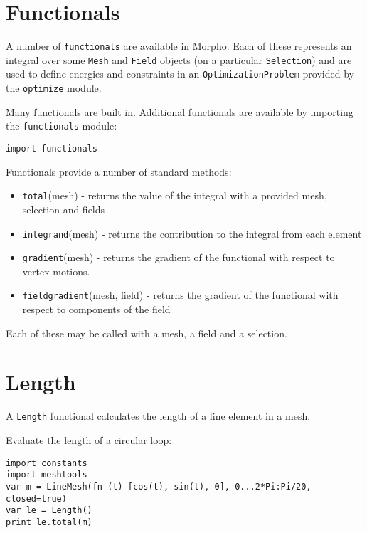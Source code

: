 \hypertarget{functionals}{%
\section{Functionals}\label{functionals}}

A number of \texttt{functionals} are available in Morpho. Each of these
represents an integral over some \texttt{Mesh} and \texttt{Field}
objects (on a particular \texttt{Selection}) and are used to define
energies and constraints in an \texttt{OptimizationProblem} provided by
the \texttt{optimize} module.

Many functionals are built in. Additional functionals are available by
importing the \texttt{functionals} module:

\begin{lstlisting}
import functionals
\end{lstlisting}

Functionals provide a number of standard methods:

\begin{itemize}

\item
  \texttt{total}(mesh) - returns the value of the integral with a
  provided mesh, selection and fields
\item
  \texttt{integrand}(mesh) - returns the contribution to the integral
  from each element
\item
  \texttt{gradient}(mesh) - returns the gradient of the functional with
  respect to vertex motions.
\item
  \texttt{fieldgradient}(mesh, field) - returns the gradient of the
  functional with respect to components of the field
\end{itemize}

Each of these may be called with a mesh, a field and a selection.

\hypertarget{length}{%
\section{Length}\label{length}}

A \texttt{Length} functional calculates the length of a line element in
a mesh.

Evaluate the length of a circular loop:

\begin{lstlisting}
import constants
import meshtools
var m = LineMesh(fn (t) [cos(t), sin(t), 0], 0...2*Pi:Pi/20, closed=true)
var le = Length()
print le.total(m)
\end{lstlisting}

